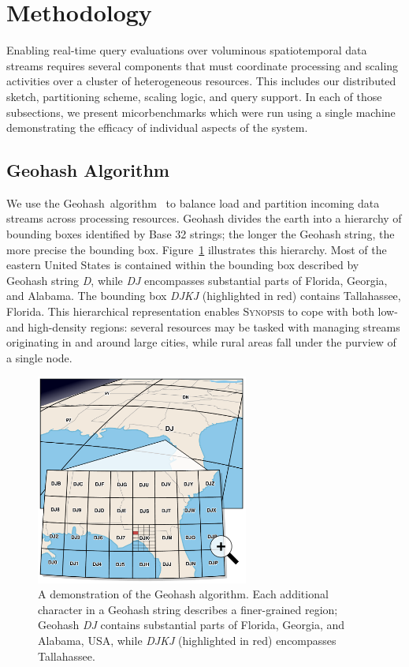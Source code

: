 \section{Methodology}
\label{sec:methodology}
Enabling real-time query evaluations over voluminous spatiotemporal data streams requires several components that must coordinate processing and scaling activities over a cluster of heterogeneous resources. This includes our distributed sketch, partitioning scheme, scaling logic, and query support. In each of those subsections, we present micorbenchmarks which were run using a single machine demonstrating the efficacy of individual aspects of the system.

\subsection{Geohash Algorithm}
We use the Geohash~algorithm~\cite{geohash} to balance load and partition incoming data streams across processing resources. Geohash divides the earth into a hierarchy of bounding boxes identified by Base 32 strings; the longer the Geohash string, the more precise the bounding box. Figure~\ref{fig:geohash} illustrates this hierarchy. Most of the eastern United States is contained within the bounding box described by Geohash string \emph{D}, while \emph{DJ} encompasses substantial parts of Florida, Georgia, and Alabama. The bounding box \emph{DJKJ} (highlighted in red) contains Tallahassee, Florida. This hierarchical representation enables \textsc{Synopsis} to cope with both low- and high-density regions: several resources may be tasked with managing streams originating in and around large cities, while rural areas fall under the purview of a single node.

\begin{figure}[b!]
    \centerline{\includegraphics[width=2.75in]{figures/geohash.pdf}}
    \caption{A demonstration of the Geohash algorithm. Each additional character in a Geohash string describes a finer-grained region; Geohash \emph{DJ} contains substantial parts of Florida, Georgia, and Alabama, USA, while \emph{DJKJ} (highlighted in red) encompasses Tallahassee.}
    \label{fig:geohash}
\end{figure}


